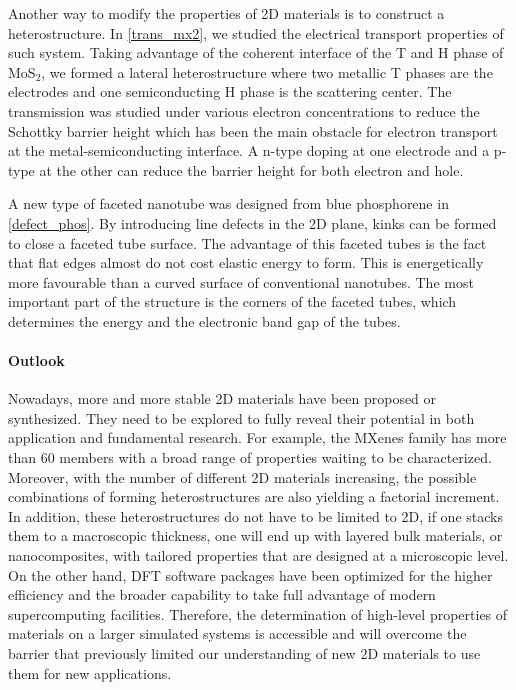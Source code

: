 Another way to modify the properties of 2D materials is to construct a heterostructure. In \autoref{trans_mx2}, we studied the electrical transport properties of such system. Taking advantage of the coherent interface of the T and H phase of MoS$_2$, we formed a lateral heterostructure where two metallic T phases are the electrodes and one semiconducting H phase is the scattering center. The transmission was studied under various electron concentrations to reduce the Schottky barrier height which has been the main obstacle for electron transport at the metal-semiconducting interface. A n-type doping at one electrode and a p-type at the other can reduce the barrier height for both electron and hole. 

A new type of faceted nanotube was designed from blue phosphorene in \autoref{defect_phos}. By introducing line defects in the 2D plane, kinks can be formed to close a faceted tube surface. The advantage of this faceted tubes is the fact that flat edges almost do not cost elastic energy to form. This is energetically more favourable than a curved surface of conventional nanotubes. The most important part of the structure is the corners of the faceted tubes, which determines the energy and the electronic band gap of the tubes.

\paragraph{Outlook} Nowadays, more and more stable 2D materials have been proposed or synthesized. They need to be explored to fully reveal their potential in both application and fundamental research. For example, the MXenes family has more than 60 members with a broad range of properties waiting to be characterized. Moreover, with the number of different 2D materials increasing, the possible combinations of forming heterostructures are also yielding a factorial increment. In addition, these heterostructures do not have to be limited to 2D, if one stacks them to a macroscopic thickness, one will end up with layered bulk materials, or nanocomposites, with tailored properties that are designed at a microscopic level. On the other hand, DFT software packages have been optimized for the higher efficiency and the broader capability to take full advantage of modern supercomputing facilities. Therefore, the determination of high-level properties of materials on a larger simulated systems is accessible and will overcome the barrier that previously limited our understanding of new 2D materials to use them for new applications.